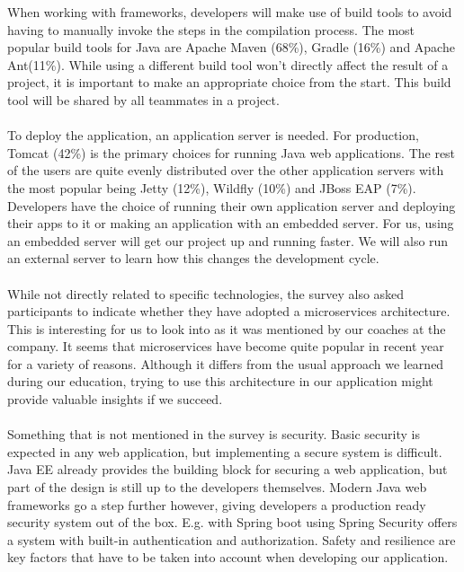 \documentclass[12pt]{article}
\begin{document}
\begin{multicols}{2}
When working with frameworks, developers will make use of build tools to avoid having to manually invoke the steps in the compilation process. The most popular build tools for Java are Apache Maven (68\%), Gradle (16\%) and Apache Ant(11\%). While using a different build tool won't directly affect the result of a project, it is important to make an appropriate choice from the start. This build tool will be shared by all teammates in a project. 
\\\\
To deploy the application, an application server is needed. For production, Tomcat (42\%) is the primary choices for running Java web applications. The rest of the users are quite evenly distributed over the other application servers with the most popular being Jetty (12\%), Wildfly (10\%) and JBoss EAP (7\%). Developers have the choice of running their own application server and deploying their apps to it or making an application with an embedded server. For us, using an embedded server will get our project up and running faster. We will also run an external server to learn how this changes the development cycle. 
\\\\
While not directly related to specific technologies, the survey also asked participants to indicate whether they have adopted a microservices architecture. This is interesting for us to look into as it was mentioned by our coaches at the company. It seems that microservices have become quite popular in recent year for a variety of reasons.\cite{WhyMicroservices48:online} Although it differs from the usual approach we learned during our education, trying to use this architecture in our application might provide valuable insights if we succeed.  
\\\\
Something that is not mentioned in the survey is security. Basic security is expected in any web application, but implementing a secure system is difficult. Java EE already provides the building block for securing a web application, but part of the design is still up to the developers themselves.\cite{JavaEESecurity29:online} Modern Java web frameworks go a step further however, giving developers a production ready security system out of the box. E.g. with Spring boot using Spring Security offers a system with built-in authentication and authorization. Safety and resilience are key factors that have to be taken into account when developing our application.
\\\\

\end{multicols}
\end{document}
